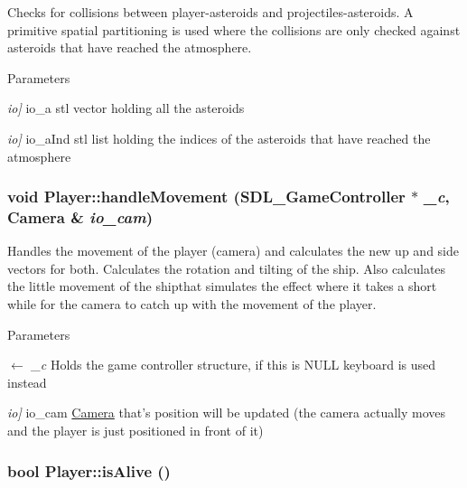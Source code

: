 Checks for collisions between player-\/asteroids and projectiles-\/asteroids. A primitive spatial partitioning is used where the collisions are only checked against asteroids that have reached the atmosphere. 
\begin{DoxyParams}{Parameters}
\item[{\em io\mbox{]}}]io\_\-a stl vector holding all the asteroids \item[{\em io\mbox{]}}]io\_\-aInd stl list holding the indices of the asteroids that have reached the atmosphere \end{DoxyParams}
\hypertarget{classPlayer_a118b1baca4ab10f79d2bbbde90a9444e}{
\subsubsection[{handleMovement}]{\setlength{\rightskip}{0pt plus 5cm}void Player::handleMovement (SDL\_\-GameController $\ast$ {\em \_\-c}, \/  {\bf Camera} \& {\em io\_\-cam})}}
\label{classPlayer_a118b1baca4ab10f79d2bbbde90a9444e}


Handles the movement of the player (camera) and calculates the new up and side vectors for both. Calculates the rotation and tilting of the ship. Also calculates the little movement of the shipthat simulates the effect where it takes a short while for the camera to catch up with the movement of the player. 
\begin{DoxyParams}{Parameters}
\item[\mbox{$\leftarrow$} {\em \_\-c}]Holds the game controller structure, if this is NULL keyboard is used instead \item[{\em io\mbox{]}}]io\_\-cam \hyperlink{classCamera}{Camera} that's position will be updated (the camera actually moves and the player is just positioned in front of it) \end{DoxyParams}
\hypertarget{classPlayer_a06e38c0f57e67eb006c9d09779bd8f8f}{
\subsubsection[{isAlive}]{\setlength{\rightskip}{0pt plus 5cm}bool Player::isAlive ()}}
\label{classPlayer_a06e38c0f57e67eb006c9d09779bd8f8f}


